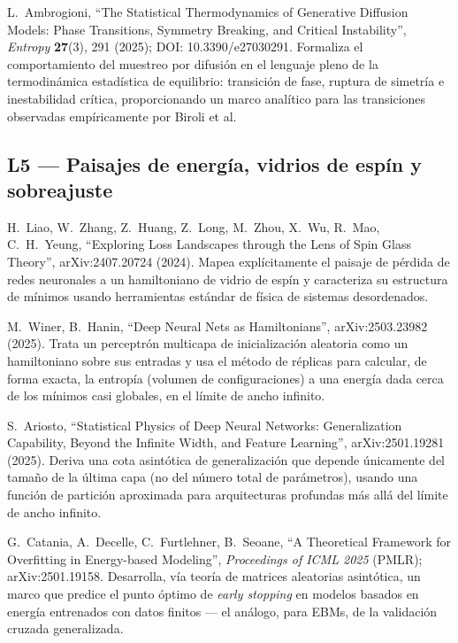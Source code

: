 \documentclass[12pt]{article}
\begin{document}
\noindent L.~Ambrogioni, ``The Statistical Thermodynamics of Generative Diffusion Models: Phase Transitions, Symmetry Breaking, and Critical Instability'', \textit{Entropy} \textbf{27}(3), 291 (2025); DOI: 10.3390/e27030291. \cite{ambrogioni2025}
Formaliza el comportamiento del muestreo por difusión en el lenguaje pleno de la termodinámica estadística de equilibrio: transición de fase, ruptura de simetría e inestabilidad crítica, proporcionando un marco analítico para las transiciones observadas empíricamente por Biroli et al.

\subsection{L5 --- Paisajes de energía, vidrios de espín y sobreajuste}

\noindent H.~Liao, W.~Zhang, Z.~Huang, Z.~Long, M.~Zhou, X.~Wu, R.~Mao, C.~H.~Yeung, ``Exploring Loss Landscapes through the Lens of Spin Glass Theory'', arXiv:2407.20724 (2024). \cite{liao2024}
Mapea explícitamente el paisaje de pérdida de redes neuronales a un hamiltoniano de vidrio de espín y caracteriza su estructura de mínimos usando herramientas estándar de física de sistemas desordenados.

\noindent M.~Winer, B.~Hanin, ``Deep Neural Nets as Hamiltonians'', arXiv:2503.23982 (2025). \cite{winer2025}
Trata un perceptrón multicapa de inicialización aleatoria como un hamiltoniano sobre sus entradas y usa el método de réplicas para calcular, de forma exacta, la entropía (volumen de configuraciones) a una energía dada cerca de los mínimos casi globales, en el límite de ancho infinito.

\noindent S.~Ariosto, ``Statistical Physics of Deep Neural Networks: Generalization Capability, Beyond the Infinite Width, and Feature Learning'', arXiv:2501.19281 (2025). \cite{ariosto2025}
Deriva una cota asintótica de generalización que depende únicamente del tamaño de la última capa (no del número total de parámetros), usando una función de partición aproximada para arquitecturas profundas más allá del límite de ancho infinito.

\noindent G.~Catania, A.~Decelle, C.~Furtlehner, B.~Seoane, ``A Theoretical Framework for Overfitting in Energy-based Modeling'', \textit{Proceedings of ICML 2025} (PMLR); arXiv:2501.19158. \cite{catania2025}
Desarrolla, vía teoría de matrices aleatorias asintótica, un marco que predice el punto óptimo de \emph{early stopping} en modelos basados en energía entrenados con datos finitos --- el análogo, para EBMs, de la validación cruzada generalizada.
\end{document}

